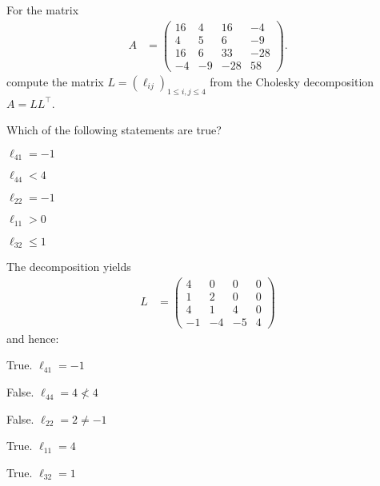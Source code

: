 

\begin{question}
For the matrix
\begin{eqnarray*}
  A &= \left( \begin{array}{rrrr}  16 &   4 &  16 &  -4 \\   4 &   5 &   6 &  -9 \\  16 &   6 &  33 & -28 \\  -4 &  -9 & -28 &  58 \end{array} \right).
\end{eqnarray*}
compute the matrix $L = (\ell_{ij})_{1 \leq i,j \leq 4}$ from the
Cholesky decomposition $ A = L L^\top$.

Which of the following statements are true?
\begin{answerlist}
  \item $\ell_{41} = -1$
  \item $\ell_{44} < 4$
  \item $\ell_{22} = -1$
  \item $\ell_{11} > 0$
  \item $\ell_{32} \le 1$
\end{answerlist}
\end{question}

\begin{solution}
The decomposition yields
\begin{eqnarray*}
  L &= \left( \begin{array}{rrrr}  4 &  0 &  0 &  0 \\  1 &  2 &  0 &  0 \\  4 &  1 &  4 &  0 \\ -1 & -4 & -5 &  4 \end{array} \right)
\end{eqnarray*}
and hence:
\begin{answerlist}
  \item True. $\ell_{41} = -1$
  \item False. $\ell_{44} = 4 \not< 4$
  \item False. $\ell_{22} = 2 \not= -1$
  \item True. $\ell_{11} = 4$
  \item True. $\ell_{32} = 1$
\end{answerlist}
\end{solution}

